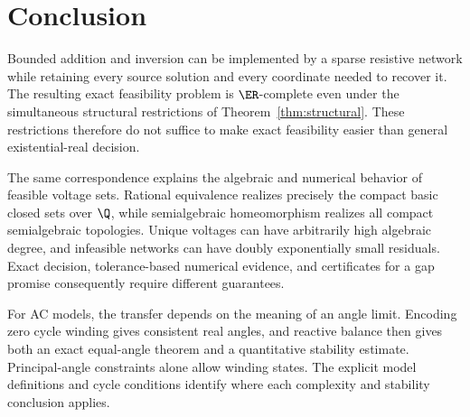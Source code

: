 \section{Conclusion}
\label{sec:conclusion}

Bounded addition and inversion can be implemented by a sparse resistive
network while retaining every source solution and every coordinate needed to
recover it. The resulting exact feasibility problem is $\ER$-complete even
under the simultaneous structural restrictions of
Theorem~\ref{thm:structural}. These restrictions therefore do not suffice to
make exact feasibility easier than general existential-real decision.

The same correspondence explains the algebraic and numerical behavior of
feasible voltage sets. Rational equivalence realizes precisely the compact
basic closed sets over $\Q$, while semialgebraic homeomorphism realizes all
compact semialgebraic topologies. Unique voltages can have arbitrarily high
algebraic degree, and infeasible networks can have doubly exponentially small
residuals. Exact decision, tolerance-based numerical evidence, and certificates
for a gap promise consequently require different guarantees.

For AC models, the transfer depends on the meaning of an angle limit.
Encoding zero cycle winding gives consistent real angles, and reactive
balance then gives both an exact equal-angle theorem and a quantitative
stability estimate. Principal-angle constraints alone allow winding states.
The explicit model definitions and cycle conditions identify where each
complexity and stability conclusion applies.
